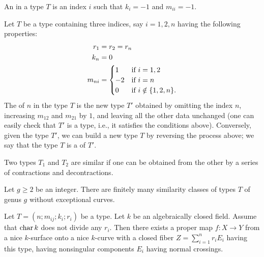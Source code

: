 \begin{defin}
 An {} in a type $T$ is an index $i$ such that $k_i = -1$ and $m_{ii} = -1$.
\end{defin}

Let $T$ be a type containing three indices, say $i = 1,2,n$ having the following properties:
\begin{align*}
 r_1 &= r_2 = r_n \\
 k_n &= 0 \\
 m_{ni} &= \begin{cases} 1 &{\textup{if }} i=1,2 \\ -2 &{\textup{if }} i=n \\ 0 &{\textup{if }} i \notin \{1,2,n\}. \end{cases}
\end{align*}
The {} of $n$ in the type $T$ is the new type $T'$ obtained by omitting the index $n$, increasing $m_{12}$ and $m_{21}$ by $1$, and leaving all the other data unchanged (one can easily check that $T'$ is a type, i.e., it satisfies the conditions above). Conversely, given the type $T'$, we can build a new type $T$ by reversing the process above; we say that the type $T$ is a {} of $T'$.

\begin{defin}
 Two types $T_1$ and $T_2$ are similar if one can be obtained from the other by a series of contractions and decontractions.
\end{defin}

\begin{thm}\cite[Theorem~1.6]{artwin}\label{finsim}
 Let $g \geq 2$ be an integer. There are finitely many similarity classes of types $T$ of genus $g$ without exceptional curves.
\end{thm}

\begin{thm}\cite[Corollary~4.3]{winters}\label{typeexistence}
 Let $T = (n; m_{ij}; k_i; r_i)$ be a type. Let $k$ be an algebraically closed field. Assume that $\operatorname{char} k$ does not divide any $r_i$. Then there exists a proper map $f \colon X \rightarrow Y$ from a nice $k$-surface onto a nice $k$-curve with a closed fiber $Z = \sum_{i=1}^n r_i E_i$ having this type, having nonsingular components $E_i$ having normal crossings.
\end{thm}

